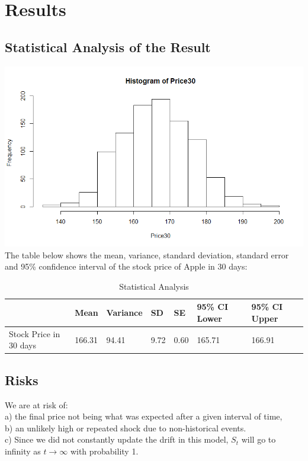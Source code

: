 \documentclass{article}
\begin{document}
\section{Results}

\subsection{Statistical Analysis of the Result}
\includegraphics[width = \textwidth]{Rplot.png}
The table below shows the mean, variance, standard deviation, standard error and 95\% confidence interval of the stock price of Apple in 30 days:
\begin{table}[hbt]
  \centering
  \caption{Statistical Analysis}
  \label{stat}
  \begin{tabular}{|l|l|l|l|l|l|l|}
  \hline
  \multicolumn{1}{|c|}{} & Mean   & Variance & SD & SE & 95\% CI Lower & 95\% CI Upper \\ \hline
  Stock Price in 30 days & 166.31 & 94.41    & 9.72               & 0.60           & 165.71              & 166.91              \\ \hline
  \end{tabular}
\end{table}

\subsection{Risks}
We are at risk of:\\
a) the final price not being what was expected after a given interval of time,\\
b) an unlikely high or repeated shock due to non-historical events.\\
c) Since we did not constantly update the drift in this model, $S_t$ will go to infinity as $t \rightarrow \infty$ with probability 1.\cite{GBM}
\end{document}
